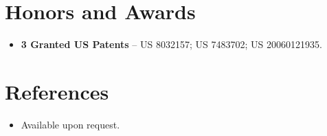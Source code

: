 \documentclass[11pt,a4paper,sans]{moderncv}
\begin{document}

\section{Honors and Awards}
\vspace{1pt}
\begin{itemize}
\item{\textbf{3 Granted US Patents} -- US 8032157; US 7483702; US 20060121935.}
\end{itemize}


\section{References}
\vspace{1pt}
\begin{itemize}
\item{Available upon request.}
\end{itemize}
\end{document}
